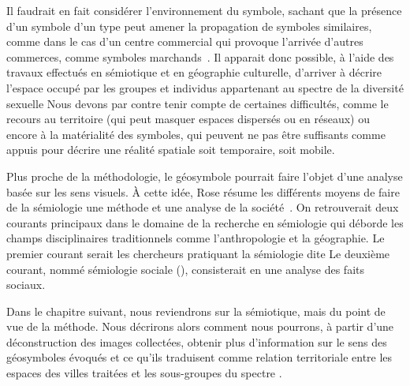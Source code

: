Il faudrait en fait considérer l'environnement du symbole, sachant que la présence d'un symbole d'un type peut amener la propagation de symboles similaires, comme dans le cas d'un centre commercial qui provoque l'arrivée d'autres commerces, comme symboles marchands~\citep[7-8]{Monnet1998}.
Il apparait donc possible, à l'aide des travaux effectués en sémiotique et en géographie culturelle, d'arriver à décrire l'espace occupé par les groupes et individus appartenant au spectre de la diversité sexuelle
Nous devons par contre tenir compte de certaines difficultés, comme le recours au territoire (qui peut masquer espaces dispersés ou en réseaux) ou encore à la matérialité des symboles, qui peuvent ne pas être suffisants comme appuis pour décrire une réalité spatiale soit temporaire, soit mobile.

Plus proche de la méthodologie, le géosymbole pourrait faire l'objet d'une analyse basée sur les sens visuels.
À cette idée, Rose résume les différents moyens de faire de la sémiologie une méthode et une analyse de la société~\citet[105--109]{Rose2012}.
On retrouverait deux courants principaux dans le domaine de la recherche en sémiologie qui déborde les champs disciplinaires traditionnels comme l'anthropologie et la géographie.
Le premier courant serait les chercheurs pratiquant la sémiologie dite 
Le deuxième courant, nommé sémiologie sociale (), consisterait en une analyse des faits sociaux.

Dans le chapitre suivant, nous reviendrons sur la sémiotique, mais du point de vue de la méthode.
Nous décrirons alors comment nous pourrons, à partir d'une déconstruction des images collectées, obtenir plus d'information sur le sens des géosymboles évoqués et ce qu'ils traduisent comme relation territoriale entre les espaces des villes traitées et les sous-groupes du spectre \lgbt{}.

